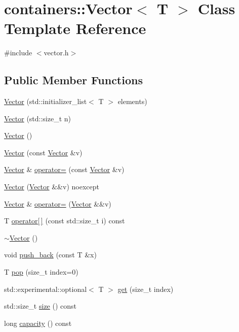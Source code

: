 \hypertarget{classcontainers_1_1_vector}{}\section{containers\+:\+:Vector$<$ T $>$ Class Template Reference}
\label{classcontainers_1_1_vector}


{\ttfamily \#include $<$vector.\+h$>$}

\subsection*{Public Member Functions}
\begin{DoxyCompactItemize}
\item 
\hyperlink{classcontainers_1_1_vector_aa52463e44a833734438f930bd042950d}{Vector} (std\+::initializer\+\_\+list$<$ T $>$ elements)
\item 
\hyperlink{classcontainers_1_1_vector_a7100579cb97bfd12a22563ecba4790c3}{Vector} (std\+::size\+\_\+t n)
\item 
\hyperlink{classcontainers_1_1_vector_aeb1cf60022c7fc50ae6b17b2cba845ea}{Vector} ()
\item 
\hyperlink{classcontainers_1_1_vector_a53ca201d23d5093f1f0a5680bf878a61}{Vector} (const \hyperlink{classcontainers_1_1_vector}{Vector} \&v)
\item 
\hyperlink{classcontainers_1_1_vector}{Vector} \& \hyperlink{classcontainers_1_1_vector_a631c15e8044b459fdf35a9f0acd0d5b0}{operator=} (const \hyperlink{classcontainers_1_1_vector}{Vector} \&v)
\item 
\hyperlink{classcontainers_1_1_vector_a2c7dfd50610c1fc054516f18ec8a9452}{Vector} (\hyperlink{classcontainers_1_1_vector}{Vector} \&\&v) noexcept
\item 
\hyperlink{classcontainers_1_1_vector}{Vector} \& \hyperlink{classcontainers_1_1_vector_aade29fc98f40e726bc1c624d0157e397}{operator=} (\hyperlink{classcontainers_1_1_vector}{Vector} \&\&v)
\item 
T \hyperlink{classcontainers_1_1_vector_a8dcbd38c932f114a8237785f8272712f}{operator\mbox{[}$\,$\mbox{]}} (const std\+::size\+\_\+t i) const
\item 
\hyperlink{classcontainers_1_1_vector_aa34389ddf377eea569195c234feaef93}{$\sim$\+Vector} ()
\item 
void \hyperlink{classcontainers_1_1_vector_ae9ecdc8f09edd4d689b4cb90a05de712}{push\+\_\+back} (const T \&x)
\item 
T \hyperlink{classcontainers_1_1_vector_a35cb0393f7ba3bc682c1a58a20471a69}{pop} (size\+\_\+t index=0)
\item 
std\+::experimental\+::optional$<$ T $>$ \hyperlink{classcontainers_1_1_vector_ab13d1394184f309d92a77e81c099a0be}{get} (size\+\_\+t index)
\item 
std\+::size\+\_\+t \hyperlink{classcontainers_1_1_vector_ad93daa14d3585dac313f3bd12d262ba7}{size} () const
\item 
long \hyperlink{classcontainers_1_1_vector_a11bd73e5c16f891d6828328feacea6b5}{capacity} () const
\end{DoxyCompactItemize}
